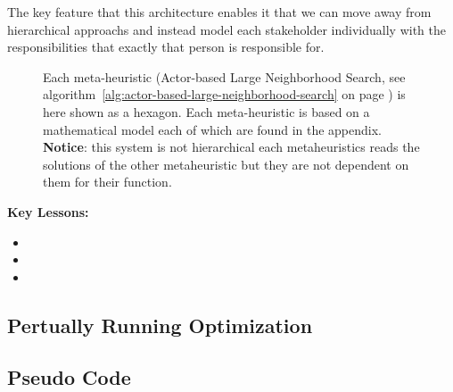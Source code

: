 The key feature that this architecture enables it that we can move away from hierarchical approachs and 
instead model each stakeholder individually with the responsibilities that exactly that person is responsible 
for. 

\begin{figure}[H]
	
	\centering
	\drawModelSetupHexagon
	\caption{
		Each meta-heuristic (Actor-based Large Neighborhood Search, see algorithm~\ref{alg:actor-based-large-neighborhood-search} on page \pageref{alg:actor-based-large-neighborhood-search}) is here shown as a hexagon.
		Each meta-heuristic is based on a mathematical model each of which are found in the appendix. \textbf{Notice}: this system is not 
		hierarchical each metaheuristics reads the solutions of the other metaheuristic but they are not dependent on them for their 
		function.
	}
\end{figure}

\textbf{Key Lessons:}
\begin{itemize}
	\item 
	\item 
	\item 
\end{itemize}

\subsection*{Pertually Running Optimization}


\subsection*{Pseudo Code}

\begin{figure}
	
\end{figure}
